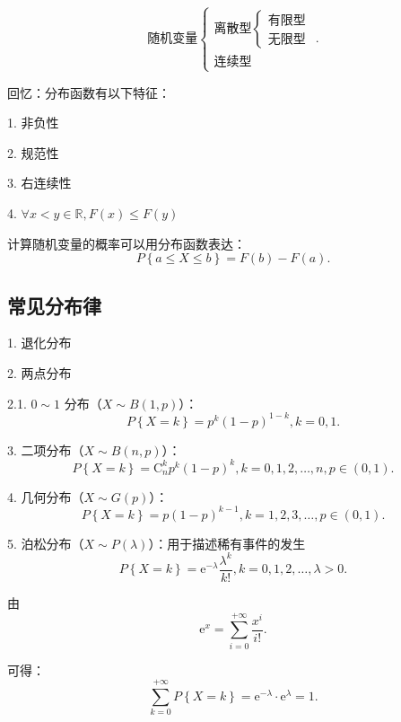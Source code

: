 \[
    \text{随机变量}\begin{cases}
        \text{离散型}\begin{cases}
            \text{有限型}\\
            \text{无限型}
        \end{cases}\\
        \text{连续型}
    \end{cases}
.\] 
\begin{notation}
    回忆：分布函数有以下特征：

    1. 非负性

    2. 规范性

    3. 右连续性

    4. $\forall x<y\in \mathbb{R}, F\left( x \right) \le F\left( y \right) $ 

    计算随机变量的概率可以用分布函数表达：
    \[
        P\left\{ a\le X\le b \right\} =F\left( b \right) -F\left( a \right) 
    .\]
\end{notation}
\subsection{常见分布律}%
\label{sub:常见分布律}
1. 退化分布

2. 两点分布

2.1. $0 \sim 1$ 分布（$X\sim B\left( 1,p \right) $）：\[
    P\left\{ X=k \right\} =p^{k}\left( 1-p \right) ^{1-k}, k=0,1
.\] 

3. 二项分布（$X\sim B\left( n,p \right) $）：\[
    P\left\{ X=k \right\} =\text{C}_{n}^{k}p^{k}\left( 1-p \right) ^{k}, k=0,1,2,\ldots,n, p \in \left( 0,1 \right) 
.\] 

4. 几何分布（$X\sim G\left( p \right) $）：\[
    P\left\{ X=k \right\} =p\left( 1-p \right) ^{k-1}, k=1,2,3,\ldots, p \in\left( 0,1 \right) 
.\] 

5. 泊松分布（$X\sim P\left( \lambda \right) $）：用于描述稀有事件的发生\[
    P\left\{ X=k \right\} =\text{e}^{-\lambda}\frac{\lambda^{k}}{k!}, k=0,1,2,\ldots,\lambda>0
.\] 
\begin{notation}
    由\[
        \text{e}^{x}=\sum_{i=0}^{+\infty} \frac{x^{i}}{i!}
    .\] 
    
    可得：
    \[
        \sum_{k=0}^{+\infty} P\left\{ X=k \right\} =\text{e}^{-\lambda}\cdot \text{e}^{\lambda}=1
    .\] 
\end{notation}

